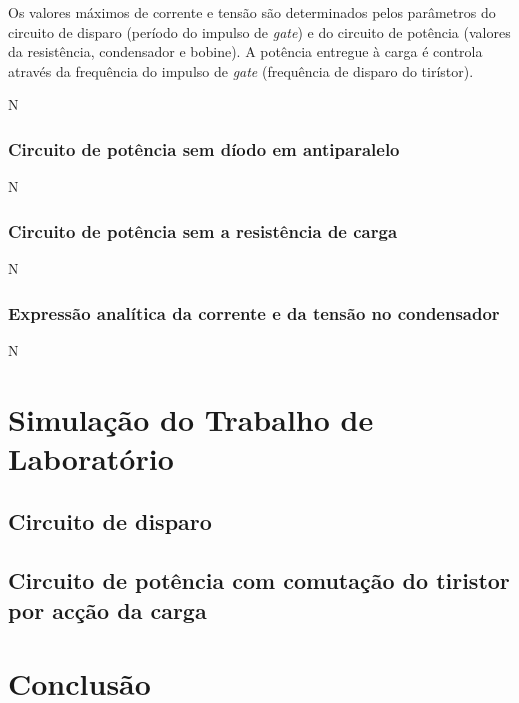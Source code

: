 \documentclass[a4paper,11pt]{article}
\numberwithin{equation}{section}
\begin{document}
	Os valores máximos de corrente e tensão são determinados pelos parâmetros do circuito de disparo (período do impulso de \textit{gate}) e do circuito de potência (valores da resistência, condensador e bobine).
	A potência entregue à carga é controla através da frequência  do impulso de \textit{gate} (frequência de disparo do tirístor).




N

\subsubsection{Circuito de potência sem díodo em antiparalelo}

N

\subsubsection{Circuito de potência sem a resistência de carga}

N

\subsubsection{Expressão analítica da corrente e da tensão no condensador}

N

\pagebreak

\section{Simulação do Trabalho de Laboratório}

\subsection{Circuito de disparo}

\subsection{Circuito de potência com comutação do tiristor por acção da carga}

\pagebreak

\section{Conclusão}
\end{document}
